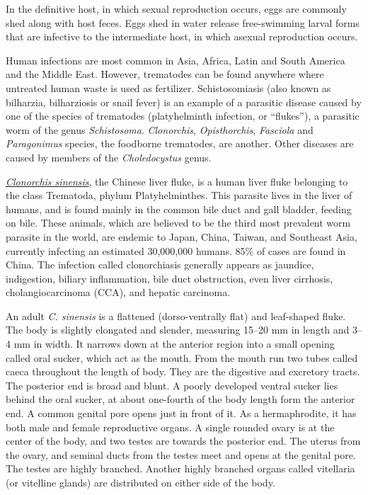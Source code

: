 In the definitive host, in which sexual reproduction occurs, eggs are
commonly shed along with host feces. Eggs shed in water release
free-swimming larval forms that are infective to the intermediate host,
in which asexual reproduction occurs.

Human infections are most common in Asia, Africa, Latin and South
America and the Middle East. However, trematodes can be found anywhere
where untreated human waste is used as fertilizer. Schistosomiasis (also
known as bilharzia, bilharziosis or snail fever) is an example of a
parasitic disease caused by one of the species of trematodes
(platyhelminth infection, or ``flukes''), a parasitic worm of the genus
\emph{Schistosoma}. \emph{Clonorchis}, \emph{Opisthorchis}, \emph{Fasciola} and \emph{Paragonimus} species,
the foodborne trematodes, are another. Other diseases are caused by
members of the \emph{Choledocystus} genus.


\href{https://en.wikipedia.org/wiki/Clonorchis_sinensis}{\emph{Clonorchis
sinensis}}, the Chinese liver fluke, is a human liver fluke belonging to
the class Trematoda, phylum Platyhelminthes. This parasite lives in the
liver of humans, and is found mainly in the common bile duct and gall
bladder, feeding on bile. These animals, which are believed to be the
third most prevalent worm parasite in the world, are endemic to Japan,
China, Taiwan, and Southeast Asia, currently infecting an estimated
30,000,000 humans. 85\% of cases are found in China. The infection
called clonorchiasis generally appears as jaundice, indigestion, biliary
inflammation, bile duct obstruction, even liver cirrhosis,
cholangiocarcinoma (CCA), and hepatic carcinoma.

An adult \emph{C. sinensis} is a flattened (dorso-ventrally flat) and
leaf-shaped fluke. The body is slightly elongated and slender, measuring
15--20 mm in length and 3--4 mm in width. It narrows down at the
anterior region into a small opening called oral sucker, which act as
the mouth. From the mouth run two tubes called caeca throughout the
length of body. They are the digestive and excretory tracts. The
posterior end is broad and blunt. A poorly developed ventral sucker lies
behind the oral sucker, at about one-fourth of the body length form the
anterior end. A common genital pore opens just in front of it. As a
hermaphrodite, it has both male and female reproductive organs. A single
rounded ovary is at the center of the body, and two testes are towards
the posterior end. The uterus from the ovary, and seminal ducts from the
testes meet and opens at the genital pore. The testes are highly
branched. Another highly branched organs called vitellaria (or vitelline
glands) are distributed on either side of the body.

